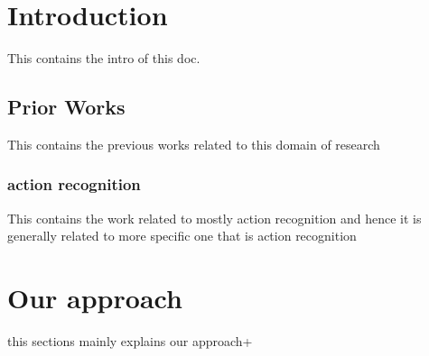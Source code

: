 \documentclass{article}
\begin{document}
  \doublespacing
  \tableofcontents
  \newpage
  \singlespacing
  \section{Introduction}
  This contains the intro of this doc.
  \subsection{Prior Works}
  This contains the previous works related to this domain of research
  \subsubsection{action recognition}
  This contains the work related to mostly action recognition and hence it is generally related to more specific one that is action recognition
  \section{Our approach}
  this sections mainly explains our approach+ 
  
\end{document}
